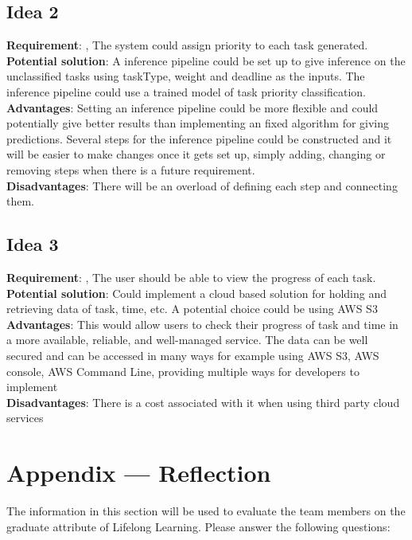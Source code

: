 \documentclass[12pt]{article}
\begin{document}
\subsection{Idea 2}
\textbf{Requirement}: , The system could assign priority to each task generated. \\
\textbf{Potential solution}: A inference pipeline could be set up to give inference on the unclassified tasks using taskType, weight and deadline as the inputs. The inference pipeline could use a trained model of task priority classification.\\
\textbf{Advantages}: Setting an inference pipeline could be more flexible and could potentially give better results than implementing an fixed algorithm for giving predictions. Several steps for the inference pipeline could be constructed and it will be easier to make changes once it gets set up, simply adding, changing or removing steps when there is a future requirement.\\
\textbf{Disadvantages}: There will be an overload of defining each step and connecting them. \\

\subsection{Idea 3}
\textbf{Requirement}: , The user should be able to view the progress of each task. \\
\textbf{Potential solution}: Could implement a cloud based solution for holding and retrieving data of task, time, etc. A potential choice could be using AWS S3\\
\textbf{Advantages}: This would allow users to check their progress of task and time in a more available, reliable, and well-managed service. The data can be well secured and can be accessed in many ways for example using AWS S3, AWS console, AWS Command Line, providing multiple ways for developers to implement  \\
\textbf{Disadvantages}: There is a cost associated with it when using third party cloud services
\newpage{}
\section*{Appendix --- Reflection}

The information in this section will be used to evaluate the team members on the
graduate attribute of Lifelong Learning.  Please answer the following questions:
\end{document}
